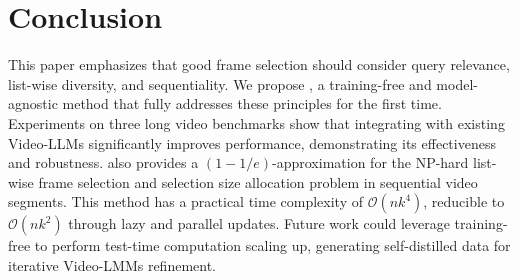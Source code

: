 \section{Conclusion}\label{sec:conclusion}

This paper emphasizes that good frame selection should consider query relevance, list-wise diversity, and sequentiality.
We propose \mname{}, a training-free and model-agnostic method that fully addresses these principles for the first time.
Experiments on three long video benchmarks show that integrating \mname{} with existing Video-LLMs significantly improves performance, demonstrating its effectiveness and robustness.
\mname{} also provides a $(1-1/e)$-approximation for the NP-hard list-wise frame selection and selection size allocation problem in sequential video segments.
This method has a practical time complexity of \(\mathcal{O}(nk^4)\), reducible to \(\mathcal{O}(nk^2)\) through lazy and parallel updates.
Future work could leverage training-free \mname{} to perform test-time computation scaling up, generating self-distilled data for iterative Video-LMMs refinement.
